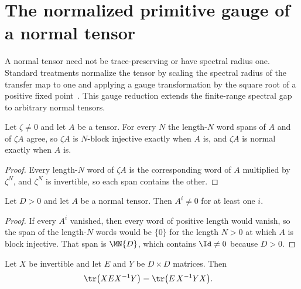 \section{The normalized primitive gauge of a normal tensor}

A normal tensor need not be trace-preserving or have spectral radius one.
Standard treatments normalize the tensor by scaling the spectral radius of the
transfer map to one and applying a gauge transformation by the square root of a
positive fixed point~\cite{Nachtergaele1996Spectral,PerezGarcia2007Matrix}. This
gauge reduction extends the finite-range spectral gap to arbitrary normal
tensors.

\begin{lemma}
    \label{thm:normality_rescaling_invariance}
    \leanok
    Let $\zeta\neq0$ and let $A$ be a tensor.  For every $N$ the length-$N$
    word spans of $A$ and of $\zeta A$ agree, so $\zeta A$ is $N$-block
    injective exactly when $A$ is, and $\zeta A$ is normal exactly when $A$ is.
\end{lemma}

\begin{proof}
    \leanok
    Every length-$N$ word of $\zeta A$ is the corresponding word of $A$
    multiplied by $\zeta^{N}$, and $\zeta^{N}$ is invertible, so each span
    contains the other.
\end{proof}

\begin{lemma}
    \label{thm:normal_tensor_nonzero_matrix}
    \leanok
    Let $D>0$ and let $A$ be a normal tensor.  Then $A^i\neq0$ for at least
    one $i$.
\end{lemma}

\begin{proof}
    \leanok
    If every $A^i$ vanished, then every word of positive length would vanish,
    so the span of the length-$N$ words would be $\{0\}$ for the length $N>0$
    at which $A$ is block injective.  That span is $\MN{D}$, which contains
    $\Id\neq0$ because $D>0$.
\end{proof}

\begin{lemma}
    \label{lem:trace_gauge_boundary}
    \leanok
    Let $X$ be invertible and let $E$ and $Y$ be $D\times D$ matrices.  Then
    \begin{align}
        \tr\bigl(XEX^{-1}Y\bigr) & =\tr\bigl(E\,X^{-1}YX\bigr). \notag
    \end{align}
\end{lemma}

